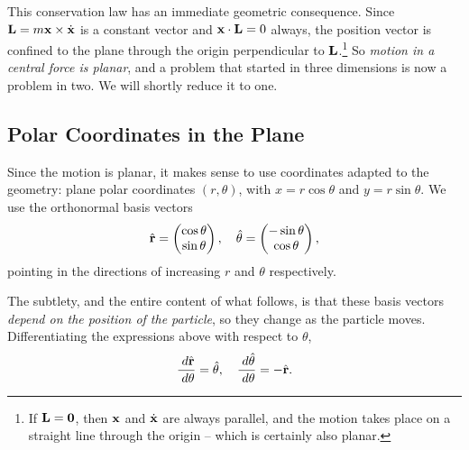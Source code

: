 \documentclass[a4paper]{scrartcl}
\newcommand{\hh}[1]{\hat{\vv{#1}}}
\begin{document}
This conservation law has an immediate geometric consequence. Since $\mathbf{L} = m \mathbf{x} \times \dot{\mathbf{x}}$ is a constant vector and $\mathbf{x} \cdot \mathbf{L} = 0$ always, the position vector is confined to the plane through the origin perpendicular to $\mathbf{L}$.\footnote{If $\mathbf{L} = \mathbf{0}$, then $\mathbf{x}$ and $\dot{\mathbf{x}}$ are always parallel, and the motion takes place on a straight line through the origin -- which is certainly also planar.} So \emph{motion in a central force is planar}, and a problem that started in three dimensions is now a problem in two. We will shortly reduce it to one.

\subsection{Polar Coordinates in the Plane}

Since the motion is planar, it makes sense to use coordinates adapted to the geometry: plane polar coordinates $(r, \theta)$, with $x = r \cos\theta$ and $y = r \sin \theta$. We use the orthonormal basis vectors
$$
\hh r = \begin{pmatrix} \cos \theta \\ \sin\theta\end{pmatrix}, \quad \hh \theta = \begin{pmatrix} -\sin\theta \\ \cos\theta \end{pmatrix},
$$
pointing in the directions of increasing $r$ and $\theta$ respectively.
\begin{center}
\end{center}
The subtlety, and the entire content of what follows, is that these basis vectors \emph{depend on the position of the particle}, so they change as the particle moves. Differentiating the expressions above with respect to $\theta$,
$$
\frac{\dd \hh r}{\dd \theta} = \hh \theta, \quad \frac{\dd \hh \theta}{\dd\theta} = - \hh r.
$$
\end{document}
